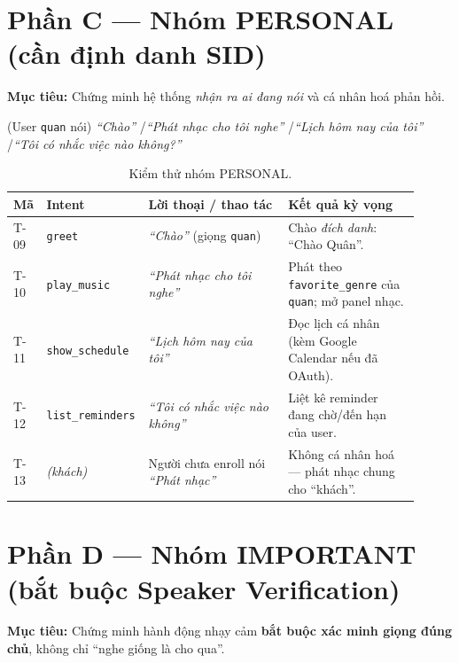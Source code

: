 \documentclass[12pt,a4paper]{article}
\newcommand{\role}[1]{\par\smallskip\noindent\textbf{\textcolor{hdr}{Mục tiêu:}} #1\par\smallskip}
\newcommand{\say}[1]{\textit{``#1''}}
\newcommand{\imp}{\textcolor{importantc}{\textbf{IMPORTANT}}}
\newcommand{\per}{\textcolor{personalc}{\textbf{PERSONAL}}}
\begin{document}
\section{Phần C --- Nhóm \per{} (cần định danh SID)}
\role{Chứng minh hệ thống \emph{nhận ra ai đang nói} và cá nhân hoá phản hồi.}

\begin{scriptbox}
(User \texttt{quan} nói) \say{Chào} \quad/\quad \say{Phát nhạc cho tôi nghe}
\quad/\quad \say{Lịch hôm nay của tôi} \quad/\quad \say{Tôi có nhắc việc nào không?}
\end{scriptbox}

\begin{table}[H]
\centering\small
\caption{Kiểm thử nhóm PERSONAL.}
\begin{tabular}{p{0.07\linewidth}p{0.18\linewidth}p{0.34\linewidth}p{0.32\linewidth}}
\toprule
\textbf{Mã} & \textbf{Intent} & \textbf{Lời thoại / thao tác} & \textbf{Kết quả kỳ vọng} \\
\midrule
T-09 & \texttt{greet} & \say{Chào} (giọng \texttt{quan}) & Chào \emph{đích danh}: ``Chào Quân''. \\
T-10 & \texttt{play\_music} & \say{Phát nhạc cho tôi nghe} & Phát theo \texttt{favorite\_genre} của \texttt{quan}; mở panel nhạc. \\
T-11 & \texttt{show\_schedule} & \say{Lịch hôm nay của tôi} & Đọc lịch cá nhân (kèm Google Calendar nếu đã OAuth). \\
T-12 & \texttt{list\_reminders} & \say{Tôi có nhắc việc nào không} & Liệt kê reminder đang chờ/đến hạn của user. \\
T-13 & \textit{(khách)} & Người chưa enroll nói \say{Phát nhạc} & Không cá nhân hoá --- phát nhạc chung cho ``khách''. \\
\bottomrule
\end{tabular}
\end{table}

\section{Phần D --- Nhóm \imp{} (bắt buộc Speaker Verification)}
\role{Chứng minh hành động nhạy cảm \textbf{bắt buộc xác minh giọng đúng chủ},
không chỉ ``nghe giống là cho qua''.}
\end{document}
